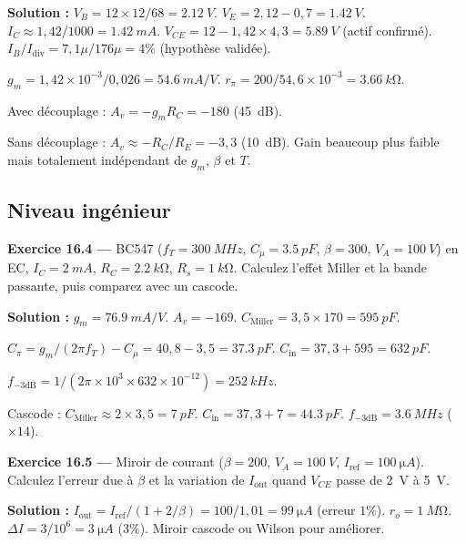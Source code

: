 \documentclass[12pt,a4paper,twoside]{book}
\begin{document}
\begin{pratique}
\textbf{Solution :} $V_B = 12\times12/68 = \SI{2.12}{V}$. $V_E = 2{,}12 - 0{,}7 = \SI{1.42}{V}$. $I_C \approx 1{,}42/1000 = \SI{1.42}{mA}$. $V_{CE} = 12 - 1{,}42\times4{,}3 = \SI{5.89}{V}$ (actif confirmé). $I_B/I_{\text{div}} = 7{,}1\mu/176\mu = 4\%$ (hypothèse validée).

$g_m = 1{,}42\times10^{-3}/0{,}026 = \SI{54.6}{mA/V}$. $r_\pi = 200/54{,}6\times10^{-3} = \SI{3.66}{k\ohm}$.

Avec découplage : $A_v = -g_m R_C = -180$ (\SI{45}{dB}).

Sans découplage : $A_v \approx -R_C/R_E = -3{,}3$ (\SI{10}{dB}). Gain beaucoup plus faible mais totalement indépendant de $g_m$, $\beta$ et $T$.
\end{pratique}

\subsection*{Niveau ingénieur}

\textbf{Exercice 16.4 ---} BC547 ($f_T = \SI{300}{MHz}$, $C_\mu = \SI{3.5}{pF}$, $\beta = 300$, $V_A = \SI{100}{V}$) en EC, $I_C = \SI{2}{mA}$, $R_C = \SI{2.2}{k\ohm}$, $R_s = \SI{1}{k\ohm}$. Calculez l'effet Miller et la bande passante, puis comparez avec un cascode.

\begin{pratique}
\textbf{Solution :} $g_m = \SI{76.9}{mA/V}$. $A_v = -169$. $C_{\text{Miller}} = 3{,}5\times170 = \SI{595}{pF}$.

$C_\pi = g_m/(2\pi f_T) - C_\mu = 40{,}8 - 3{,}5 = \SI{37.3}{pF}$. $C_{\text{in}} = 37{,}3 + 595 = \SI{632}{pF}$.

$f_{-3\text{dB}} = 1/(2\pi\times10^3\times632\times10^{-12}) = \SI{252}{kHz}$.

Cascode : $C_{\text{Miller}} \approx 2\times3{,}5 = \SI{7}{pF}$. $C_{\text{in}} = 37{,}3+7 = \SI{44.3}{pF}$. $f_{-3\text{dB}} = \SI{3.6}{MHz}$ ($\times 14$).
\end{pratique}

\textbf{Exercice 16.5 ---} Miroir de courant ($\beta = 200$, $V_A = \SI{100}{V}$, $I_{\text{ref}} = \SI{100}{\micro A}$). Calculez l'erreur due à $\beta$ et la variation de $I_{\text{out}}$ quand $V_{CE}$ passe de \SI{2}{V} à \SI{5}{V}.

\begin{pratique}
\textbf{Solution :} $I_{\text{out}} = I_{\text{ref}}/(1+2/\beta) = 100/1{,}01 = \SI{99}{\micro A}$ (erreur $1\%$). $r_o = \SI{1}{M\ohm}$. $\Delta I = 3/10^6 = \SI{3}{\micro A}$ ($3\%$). Miroir cascode ou Wilson pour améliorer.
\end{pratique}
\end{document}
